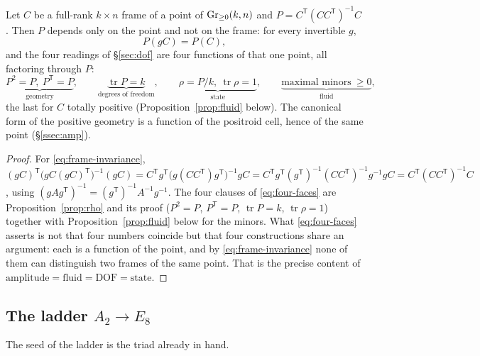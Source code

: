 \begin{theorem}\label{thm:faces}
Let $C$ be a full-rank $k\times n$ frame of a point of $\mathrm{Gr}_{\ge0}(k,n)$ and
$P=C^{\mathsf T}(CC^{\mathsf T})^{-1}C$. Then $P$ depends only on the point and not on the frame:
for every invertible $g$,
\begin{equation}\label{eq:frame-invariance}
  P(gC)=P(C),
\end{equation}
and the four readings of \S\ref{sec:dof} are four functions of that one point, all factoring
through $P$:
\begin{equation}\label{eq:four-faces}
  \underbrace{P^{2}=P,\ P^{\mathsf T}=P}_{\text{geometry}},\qquad
  \underbrace{\operatorname{tr}P=k}_{\text{degrees of freedom}},\qquad
  \underbrace{\rho=P/k,\ \operatorname{tr}\rho=1}_{\text{state}},\qquad
  \underbrace{\text{maximal minors}\ \ge 0}_{\text{fluid}} ,
\end{equation}
the last for $C$ totally positive (Proposition~\ref{prop:fluid} below). The canonical form of the
positive geometry is a function of the positroid cell, hence of the same point
(\S\ref{ssec:amp}).
%

%
\end{theorem}
\begin{proof}
For \eqref{eq:frame-invariance}, $(gC)^{\mathsf T}\bigl(gC(gC)^{\mathsf T}\bigr)^{-1}(gC)
=C^{\mathsf T}g^{\mathsf T}\bigl(g(CC^{\mathsf T})g^{\mathsf T}\bigr)^{-1}gC
=C^{\mathsf T}g^{\mathsf T}(g^{\mathsf T})^{-1}(CC^{\mathsf T})^{-1}g^{-1}gC
=C^{\mathsf T}(CC^{\mathsf T})^{-1}C$, using $(gAg^{\mathsf T})^{-1}=(g^{\mathsf T})^{-1}A^{-1}g^{-1}$.
The four clauses of \eqref{eq:four-faces} are Proposition~\ref{prop:rho} and its proof
($P^2=P$, $P^{\mathsf T}=P$, $\operatorname{tr}P=k$, $\operatorname{tr}\rho=1$) together with
Proposition~\ref{prop:fluid} below for the minors. What \eqref{eq:four-faces} asserts is not that four
numbers coincide but that four constructions share an argument: each is a function of the point,
and by \eqref{eq:frame-invariance} none of them can distinguish two frames of the same point.
That is the precise content of $\text{amplitude}=\text{fluid}=\text{DOF}=\text{state}$.
\end{proof}

\subsection{The ladder \texorpdfstring{$A_2\to E_8$}{A2->E8}}\label{ssec:ladder}
The seed of the ladder is the triad already in hand.

